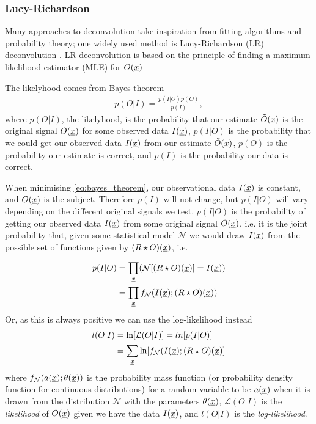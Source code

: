 \subsubsection{Lucy-Richardson}

Many approaches to deconvolution take inspiration from fitting algorithms and probability theory; one widely used method is Lucy-Richardson (LR) \cite{Richardson72,Lucy74} deconvolution \cite[][section 5.4]{Starck02}. LR-deconvolution is based on the principle of finding a maximum likelihood estimator (MLE) for $O(\underline{x})$

The likelyhood comes from Bayes theorem
\begin{align}
	p(O|I) = \frac{p(I|O) p(O)}{p(I)},
	\label{eq:bayes_theorem}
\end{align}
where $p(O|I)$, the likelyhood, is the probability that our estimate $\tilde{O}(\underline{x})$ is the original signal $O(\underline{x})$ for some observed data $I(\underline{x})$, $p(I|O)$ is the probability that we could get our observed data $I(\underline{x})$ from our estimate $\tilde{O}(\underline{x})$, $p(O)$ is the probability our estimate is correct, and $p(I)$ is the probability our data is correct.

When minimising \eqref{eq:bayes_theorem}, our observational data $I(\underline{x})$ is constant, and $O(\underline{x})$ is the subject. Therefore $p(I)$ will not change, but $p(I|O)$ will vary depending on the different original signals we test. $p(I|O)$ is the probability of getting our observed data $I(\underline{x})$ from some original signal $O(\underline{x})$, i.e. it is the joint probability that, given some statistical model $\mathcal{N}$ we would draw $I(\underline{x})$ from the possible set of functions given by $(R\star O)(\underline{x})$, i.e.

\begin{align*}
	p(I|O) 	&= \prod_{\underline{x}} (\mathcal{N}[(R \star O)(\underline{x})] = I(\underline{x})) \\
			&= \prod_{\underline{x}} f_{\mathcal{N}}(I(\underline{x});(R \star O)(\underline{x}))
\end{align*}
Or, as this is always positive we can use the log-likelihood instead
\begin{align}
	l(O|I) &= \textrm{ln}[\mathcal{L}(O|I)] = ln[p(I|O)] \nonumber \\
		&= \sum_{\underline{x}} \textrm{ln}[f_{\mathcal{N}}(I(\underline{x});(R \star O)(\underline{x})] \\
	\label{eq:likelihood}
\end{align}
where $f_{\mathcal{N}}(a(\underline{x}); \theta(\underline{x}))$ is the probability mass function (or probability density function for continuous distributions) for a random variable to be $a(\underline{x})$ when it is drawn from the distribution $\mathcal{N}$ with the parameters $\theta(\underline{x})$, $\mathcal{L}(O|I)$ is the \emph{likelihood} of $O(\underline{x})$ given we have the data $I(\underline{x})$, and $l(O|I)$ is the \emph{log-likelihood}.

